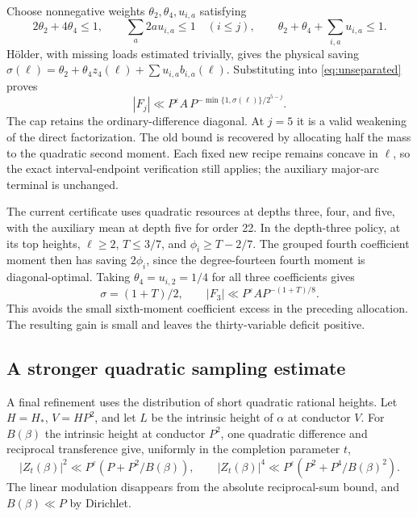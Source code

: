 \documentclass[11pt,letterpaper]{article}
\theoremstyle{remark}
\newcommand{\eps}{\varepsilon}
\begin{document}
Choose nonnegative weights $\theta_2,\theta_4,u_{i,a}$ satisfying
\[
 2\theta_2+4\theta_4\le1,\qquad
 \sum_a2a u_{i,a}\le1\quad(i\le j),\qquad
 \theta_2+\theta_4+\sum_{i,a}u_{i,a}\le1.
\]
H\"older, with missing loads estimated trivially, gives the physical saving
$\sigma(\ell)=\theta_2+\theta_4z_4(\ell)+\sum u_{i,a}b_{i,a}(\ell)$.
Substituting into \eqref{eq:unseparated} proves
\begin{equation}\label{eq:quadratic-pointwise}
 |F_j|\ll P^\eps A\,
                  P^{-\min\{1,\sigma(\ell)\}/2^{5-j}}.
\end{equation}
The cap retains the ordinary-difference diagonal. At $j=5$ it is a valid weakening
of the direct factorization. The old bound is recovered by allocating half the
mass to the quadratic second moment. Each fixed new recipe remains concave in
$\ell$, so the exact interval-endpoint verification still applies; the auxiliary
major-arc terminal is unchanged.

The current certificate uses quadratic resources at depths three, four, and five,
with the auxiliary mean at depth five for order 22. In the depth-three policy,
at its top heights,
$\ell\ge2$, $T\le3/7$, and $\phi_i\ge T-2/7$. The grouped fourth coefficient
moment then has saving $2\phi_i$, since the degree-fourteen fourth moment is
diagonal-optimal. Taking $\theta_4=u_{i,2}=1/4$ for all three coefficients gives
\[
 \sigma=(1+T)/2,\qquad
                   |F_3|\ll P^\eps A P^{-(1+T)/8}.
\]
This avoids the small sixth-moment coefficient excess in the preceding allocation.
The resulting gain is small and leaves the thirty-variable deficit positive.

\subsection{A stronger quadratic sampling estimate}

A final refinement uses the distribution of short quadratic rational heights.
Let $H=H_*$, $V=HP^2$, and let $L$ be the intrinsic height of $\alpha$ at
conductor $V$. For $B(\beta)$ the intrinsic height at conductor $P^2$, one
quadratic difference and reciprocal transference give, uniformly in the completion
parameter $t$,
\[
 |Z_t(\beta)|^2\ll P^\eps(P+P^2/B(\beta)),\qquad
 |Z_t(\beta)|^4\ll P^\eps(P^2+P^4/B(\beta)^2).
\]
The linear modulation disappears from the absolute reciprocal-sum bound, and
$B(\beta)\ll P$ by Dirichlet.
\end{document}
